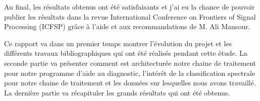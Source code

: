 Au final, les résultats obtenus ont été satisfaisants et j'ai eu la chance de pouvoir publier les résultats dans la revue International Conference on Frontiers of Signal Processing (ICFSP) grâce à l'aide et aux recommandations de M. Ali Mansour.

\medskip


Ce rapport va dans un premier temps montrer l'évolution du projet et les différents travaux bibliographiques qui ont été réalisés pendant cette étude. La seconde partie va présenter comment est architecturée notre chaine de traitement pour notre programme d'aide au diagnostic, l'intérêt de la classification spectrale pour notre chaine de traitement et les données sur lesquelles nous avons travaillé. La dernière partie va récapituler les grands résultats qui ont été obtenus.

